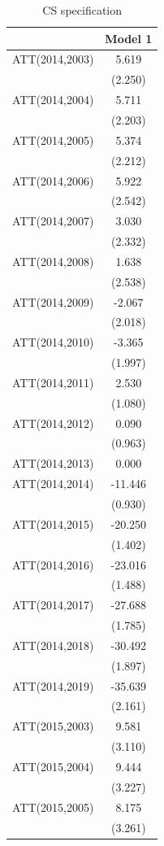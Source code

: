 \documentclass[
  12pt,
]{article}
\begin{document}
\begin{table}

\caption{\label{tab:table-4}CS specification}
\centering
\begin{tabular}[t]{lc}
\toprule
  & Model 1\\
\midrule
ATT(2014,2003) & 5.619\\
 & (2.250)\\
ATT(2014,2004) & 5.711\\
 & (2.203)\\
ATT(2014,2005) & 5.374\\
 & (2.212)\\
ATT(2014,2006) & 5.922\\
 & (2.542)\\
ATT(2014,2007) & 3.030\\
 & (2.332)\\
ATT(2014,2008) & 1.638\\
 & (2.538)\\
ATT(2014,2009) & -2.067\\
 & (2.018)\\
ATT(2014,2010) & -3.365\\
 & (1.997)\\
ATT(2014,2011) & 2.530\\
 & (1.080)\\
ATT(2014,2012) & 0.090\\
 & (0.963)\\
ATT(2014,2013) & 0.000\\
ATT(2014,2014) & -11.446\\
 & (0.930)\\
ATT(2014,2015) & -20.250\\
 & (1.402)\\
ATT(2014,2016) & -23.016\\
 & (1.488)\\
ATT(2014,2017) & -27.688\\
 & (1.785)\\
ATT(2014,2018) & -30.492\\
 & (1.897)\\
ATT(2014,2019) & -35.639\\
 & (2.161)\\
ATT(2015,2003) & 9.581\\
 & (3.110)\\
ATT(2015,2004) & 9.444\\
 & \vphantom{1} (3.227)\\
ATT(2015,2005) & 8.175\\
 & (3.261)\\

\end{tabular}
\end{table}
\end{document}

